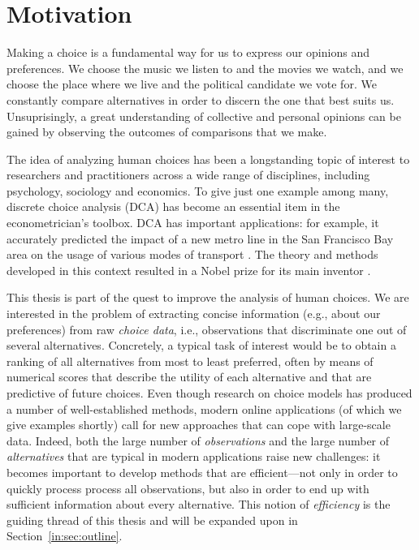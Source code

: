 \section{Motivation}
\label{in:sec:motivation}

Making a choice is a fundamental way for us to express our opinions and preferences.
We choose the music we listen to and the movies we watch, and we choose the place where we live and the political candidate we vote for.
We constantly compare alternatives in order to discern the one that best suits us.
Unsuprisingly, a great understanding of collective and personal opinions can be gained by observing the outcomes of comparisons that we make.

The idea of analyzing human choices has been a longstanding topic of interest to researchers and practitioners across a wide range of disciplines, including psychology, sociology and economics.
To give just one example among many, discrete choice analysis (DCA) has become an essential item in the econometrician's toolbox.
DCA has important applications: for example, it accurately predicted the impact of a new metro line in the San Francisco Bay area on the usage of various modes of transport \citep{mcfadden1977demand}.
The theory and methods developed in this context resulted in a Nobel prize for its main inventor \citep{mcfadden2001economic}.

This thesis is part of the quest to improve the analysis of human choices.
We are interested in the problem of extracting concise information (e.g., about our preferences) from raw \emph{choice data}, i.e., observations that discriminate one out of several alternatives.
Concretely, a typical task of interest would be to obtain a ranking of all alternatives from most to least preferred, often by means of numerical scores that describe the utility of each alternative and that are predictive of future choices.
Even though research on choice models has produced a number of well-established methods, modern online applications (of which we give examples shortly) call for new approaches that can cope with large-scale data.
Indeed, both the large number of \emph{observations} and the large number of \emph{alternatives} that are typical in modern applications raise new challenges:
it becomes important to develop methods that are efficient---not only in order to quickly process process all observations, but also in order to end up with sufficient information about every alternative.
This notion of \emph{efficiency} is the guiding thread of this thesis and will be expanded upon in Section~\ref{in:sec:outline}.

